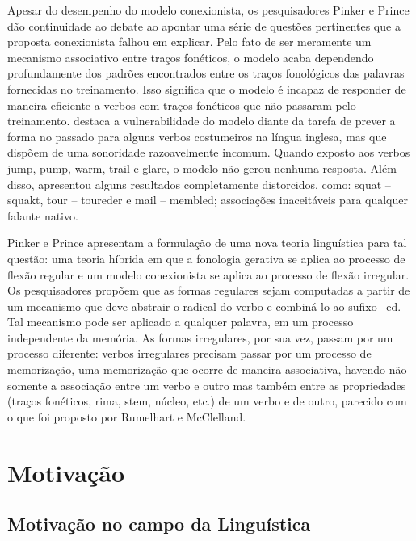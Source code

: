 Apesar do desempenho do modelo conexionista, os pesquisadores Pinker e Prince \citeyear{Pinker:1988} dão continuidade ao debate ao apontar uma série de questões pertinentes que a proposta conexionista falhou em explicar.  Pelo fato de ser meramente um mecanismo associativo entre traços fonéticos, o modelo acaba dependendo profundamente dos padrões encontrados entre os traços fonológicos das palavras fornecidas no treinamento. Isso significa que o modelo é incapaz de responder de maneira eficiente a verbos com traços fonéticos que não passaram pelo treinamento. \cite{Pinker:1999} destaca a vulnerabilidade do modelo diante da tarefa de prever a forma no passado para alguns verbos costumeiros na língua inglesa, mas que dispõem de uma sonoridade razoavelmente incomum. Quando exposto aos verbos jump, pump, warm,  trail e glare, o modelo não gerou nenhuma resposta. Além disso, apresentou alguns resultados completamente distorcidos, como: squat – squakt, tour – toureder e mail – membled; associações inaceitáveis para qualquer falante nativo. 

Pinker e Prince \citeyear{Pinker:1988} apresentam a formulação de uma nova teoria linguística para tal questão: uma teoria híbrida em que a fonologia gerativa se aplica ao processo de flexão regular e um modelo conexionista se aplica ao processo de flexão irregular. Os pesquisadores propõem que as formas regulares sejam computadas a partir de um mecanismo que deve abstrair o radical do verbo e combiná-lo ao sufixo –ed.  Tal mecanismo pode ser aplicado a qualquer palavra, em um processo independente da memória. As formas irregulares, por sua vez, passam por um processo diferente: verbos irregulares precisam passar por um processo de memorização, uma memorização que ocorre de maneira associativa, havendo não somente a associação entre um verbo e outro mas também entre as propriedades (traços fonéticos, rima, stem, núcleo, etc.) de um verbo e de outro, parecido com o que foi proposto por Rumelhart e McClelland.

\section{Motivação}
\label{sec:motivation}

\subsection{Motivação no campo da Linguística}


